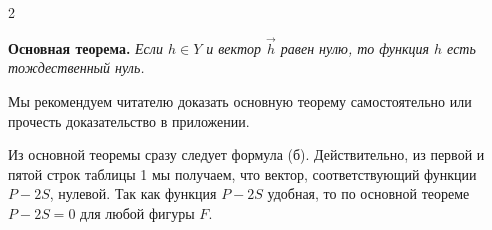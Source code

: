 \documentclass[12pt]{article} %
\begin{document}
\begin{paracol}{2}
\medskip

\noindent\textbf{Основная теорема.} \textit{Если $h\in Y$ и вектор $\vec h$ равен нулю, то функция $h$ есть тождественный нуль.}

Мы рекомендуем читателю доказать основную теорему самостоятельно или прочесть доказательство в приложении.

Из основной теоремы сразу следует формула (б). Действительно, из первой и пятой строк таблицы 1 мы получаем, что вектор, соответствующий функции $P-2S$, нулевой. Так как функция $P-2S$ удобная, то по основной теореме $P-2S=0$ для любой фигуры $F$.

\end{paracol}
\end{document}
